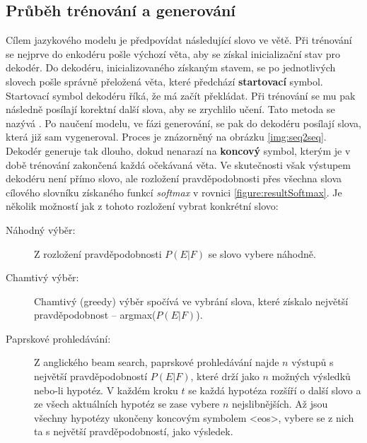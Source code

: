 \subsection{Průběh trénování a generování}

Cílem jazykového modelu je předpovídat následující slovo ve větě. Při trénování se nejprve do enkodéru pošle výchozí věta, aby se získal inicializační stav pro dekodér. Do dekodéru, inicializovaného získaným stavem, se po jednotlivých slovech pošle správně přeložená věta, které předchází \textbf{startovací} symbol. Startovací symbol dekodéru říká, že má začít překládat. Při trénování se mu pak následně posílají korektní další slova, aby se zrychlilo učení. Tato metoda se nazývá . Po naučení modelu, ve fázi generování, se pak do dekodéru posílají slova, která již sam vygeneroval. Proces je znázorněný na obrázku \ref{img:seq2seq}. Dekodér generuje tak dlouho, dokud nenarazí na \textbf{koncový} symbol, kterým je v době trénování zakončená každá očekávaná věta. Ve skutečnosti však výstupem dekodéru není přímo slovo, ale rozložení pravděpodobnosti přes všechna slova cílového slovníku získaného funkcí \emph{softmax} v rovnici \ref{figure:resultSoftmax}. Je několik možností jak z tohoto rozložení vybrat konkrétní slovo:

\begin{description}
  \item[Náhodný výběr:] Z rozložení pravděpodobnosti $P(E|F)$ se slovo vybere náhodně.
  \item[Chamtivý výběr:] Chamtivý (greedy) výběr spočívá ve vybrání slova, které získalo největší pravděpodobnost -- argmax($P(E|F)$).
  \item[Paprskové prohledávání:] Z anglického beam search, paprskové prohledávání najde $n$ výstupů s největší pravděpodobností $P(E|F)$, které drží jako $n$ možných výsledků nebo-li hypotéz. V každém kroku $t$ se každá hypotéza rozšíří o další slovo a ze všech aktuálních hypotéz se zase vybere $n$ nejslibnějších. Až jsou všechny hypotézy ukončeny koncovým symbolem <eos>, vybere se z nich ta s největší pravděpodobností, jako výsledek.
\end{description}


